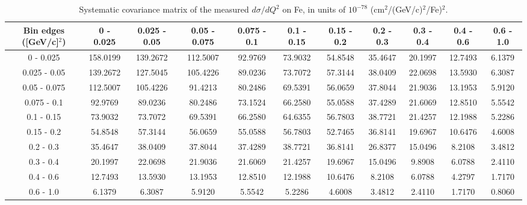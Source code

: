\documentclass[aps,prl,twocolumn,superscriptaddress,nofootinbib]{revtex4-1}
\begin{document}
\begin{table}[h!]
  \centering
  \caption{Systematic covariance matrix of the measured $d\sigma/dQ^{2}$ on Fe, in units of $10^{-78}$ (cm$^{2}$/(GeV/c)$^{2}$/Fe)$^{2}$.}
    \begin{tabular}{c||cccccccccc}
      Bin edges ([GeV/c]$^{2}$) & 0 - 0.025 & 0.025 - 0.05 & 0.05 - 0.075 & 0.075 - 0.1 & 0.1 - 0.15 & 0.15 - 0.2 & 0.2 - 0.3 & 0.3 - 0.4 & 0.4 - 0.6 & 0.6 - 1.0 \\
\hline \hline
         0 - 0.025 & 158.0199 & 139.2672 & 112.5007 & 92.9769 & 73.9032 & 54.8548 & 35.4647 & 20.1997 & 12.7493 &  6.1379 \\
      0.025 - 0.05 & 139.2672 & 127.5045 & 105.4226 & 89.0236 & 73.7072 & 57.3144 & 38.0409 & 22.0698 & 13.5930 &  6.3087 \\
      0.05 - 0.075 & 112.5007 & 105.4226 & 91.4213 & 80.2486 & 69.5391 & 56.0659 & 37.8044 & 21.9036 & 13.1953 &  5.9120 \\
       0.075 - 0.1 & 92.9769 & 89.0236 & 80.2486 & 73.1524 & 66.2580 & 55.0588 & 37.4289 & 21.6069 & 12.8510 &  5.5542 \\
        0.1 - 0.15 & 73.9032 & 73.7072 & 69.5391 & 66.2580 & 64.6355 & 56.7803 & 38.7721 & 21.4257 & 12.1988 &  5.2286 \\
        0.15 - 0.2 & 54.8548 & 57.3144 & 56.0659 & 55.0588 & 56.7803 & 52.7465 & 36.8141 & 19.6967 & 10.6476 &  4.6008 \\
         0.2 - 0.3 & 35.4647 & 38.0409 & 37.8044 & 37.4289 & 38.7721 & 36.8141 & 26.8377 & 15.0496 &  8.2108 &  3.4812 \\
         0.3 - 0.4 & 20.1997 & 22.0698 & 21.9036 & 21.6069 & 21.4257 & 19.6967 & 15.0496 &  9.8908 &  6.0788 &  2.4110 \\
         0.4 - 0.6 & 12.7493 & 13.5930 & 13.1953 & 12.8510 & 12.1988 & 10.6476 &  8.2108 &  6.0788 &  4.2797 &  1.7170 \\
         0.6 - 1.0 &  6.1379 &  6.3087 &  5.9120 &  5.5542 &  5.2286 &  4.6008 &  3.4812 &  2.4110 &  1.7170 &  0.8060 \\
    \end{tabular}
  \label{tablecov:Fe_Systematic_Q2}
\end{table}
\end{document}
